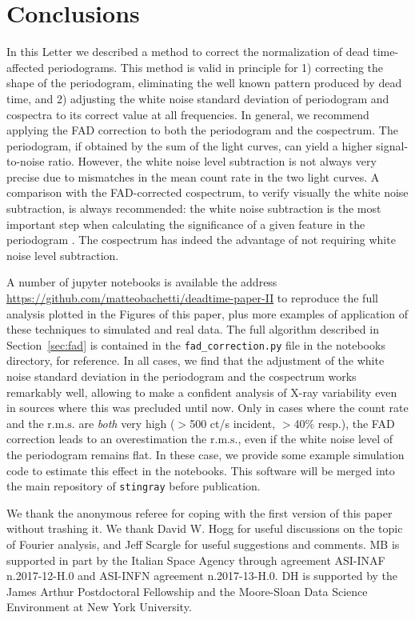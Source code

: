 \documentclass[twocolumn]{aastex61}
\newcommand{\rms}{\ensuremath{\mathrm{r.m.s.}}\xspace}
\begin{document}
\section{Conclusions}
In this Letter we described a method to correct the normalization of dead time-affected periodograms.
This method is valid in principle for 
1) correcting the shape of the periodogram, eliminating the well known pattern produced by dead time, and 
2) adjusting the white noise standard deviation of periodogram and cospectra to its correct value at all frequencies.
In general, we recommend applying the FAD correction to both the periodogram and the cospectrum. 
The periodogram, if obtained by the sum of the light curves, can yield a higher signal-to-noise ratio.
However, the white noise level subtraction is not always very precise due to mismatches in the mean count rate in the two light curves. 
A comparison with the FAD-corrected cospectrum, to verify visually the white noise subtraction, is always recommended: the white noise subtraction is the most important step when calculating the significance of a given feature in the periodogram \citep[e.g.][]{Barret+12,Huppenkothen+17}.
The cospectrum has indeed the advantage of not requiring white noise level subtraction.

A number of jupyter notebooks is available the address \href{https://github.com/matteobachetti/deadtime-paper-II}{https://github.com/matteobachetti/deadtime-paper-II} to reproduce the full analysis plotted in the Figures of this paper, plus more examples of application of these techniques to simulated and real data.
The full algorithm described in Section~\ref{sec:fad} is contained in the \texttt{fad\_correction.py} file in the notebooks directory, for reference.
In all cases, we find that the adjustment of the white noise standard deviation in the periodogram and the cospectrum works remarkably well, allowing to make a confident analysis of X-ray variability even in sources where this was precluded until now.
Only in cases where the count rate and the \rms are \textit{both} very high ($>$500 ct/s incident, $>$40\% resp.), the FAD correction leads to an overestimation the \rms, even if the white noise level of the periodogram remains flat.
In these case, we provide some example simulation code to estimate this effect in the notebooks.
This software will be merged into the main repository of \texttt{stingray} before publication.


\acknowledgments
We thank the anonymous referee for coping with the first version of this paper without trashing it.
We thank David W. Hogg for useful discussions on the topic of Fourier analysis, and Jeff Scargle for useful suggestions and comments.
MB is supported in part by the Italian Space Agency through agreement ASI-INAF n.2017-12-H.0 and ASI-INFN agreement n.2017-13-H.0.
DH is supported by the James Arthur Postdoctoral Fellowship and the Moore-Sloan Data Science Environment at New York University.
\end{document}
